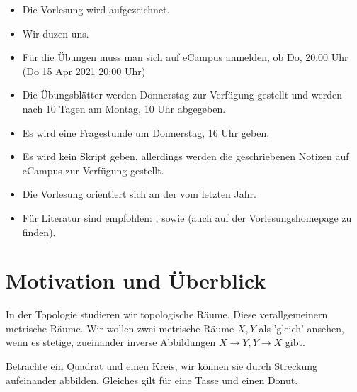 \begin{orga}
\begin{itemize}
\item    Die Vorlesung wird aufgezeichnet.
\item Wir duzen uns.
\item Für die Übungen muss man sich auf eCampus anmelden, ob Do, 20:00 Uhr (Do 15 Apr 2021 20:00 Uhr)
\item Die Übungsblätter werden Donnerstag zur Verfügung gestellt und werden nach 10 Tagen am Montag, 10 Uhr abgegeben.
\item Es wird eine Fragestunde um Donnerstag, 16 Uhr geben.
\item Es wird kein Skript geben, allerdings werden die geschriebenen Notizen auf eCampus zur Verfügung gestellt.
\item Die Vorlesung orientiert sich an der vom letzten Jahr.
\item Für Literatur sind empfohlen: \cite{topology-waldhausen}, \cite{algebraic-topology-hatcher} sowie \cite{topology-and-geometry} (auch auf der Vorlesungshomepage zu finden).
\end{itemize}
\end{orga}

\setcounter{section}{-1}

\section{Motivation und Überblick}
In der Topologie studieren wir topologische Räume. Diese verallgemeinern metrische Räume. Wir wollen zwei metrische Räume $X,Y$ als 'gleich' ansehen, wenn es stetige, zueinander inverse Abbildungen  $X \to  Y, Y\to X$ gibt.
\begin{example}
    Betrachte ein Quadrat und einen Kreis, wir können sie durch Streckung aufeinander abbilden. Gleiches gilt für eine Tasse und einen Donut. \\
    \begin{minipage}{\textwidth}
    \centering
    \begin{minipage}{0.45\textwidth}
    \end{minipage}
    \begin{minipage}{0.45\textwidth}
    \end{minipage}
\end{minipage}
\end{example}




